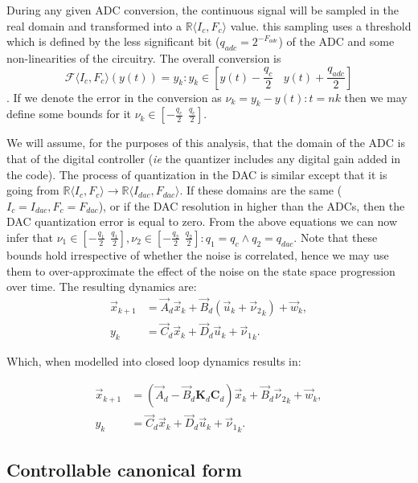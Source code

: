 \documentclass[runningheads,a4paper]{llncs}
\newcommand{\mat}[1]{\boldsymbol{#1}}
\begin{document}
During any given ADC conversion, the continuous signal will be sampled in the real domain and transformed into a $\mathbb{R}\langle I_{c},F_{c} \rangle$ value. this sampling uses a threshold which is defined by the less significant bit ($q_{adc}=2^{-F_{adc}}$) of the ADC and some non-linearities of the circuitry. The overall conversion is
$$\mathcal{F}\langle I_{c},F_{c} \rangle(y(t)) = y_k : y_k \in \left[y(t)-\frac{q_{c}}{2}\ \ \ \ y(t)+\frac{q_{adc}}{2}\right]$$.
If we denote the error in the conversion as $\nu_k=y_k-y(t) : t=nk$ then we may define some bounds for it $\nu_k \in [-\frac{q_{c}}{2}\ \ \frac{q_{c}}{2}]$.

We will assume, for the purposes of this analysis, that the domain of the ADC is that of the digital controller (\emph{ie} the quantizer includes any digital gain added in the code).
The process of quantization in the DAC is similar except that it is going from $\mathbb{R}\langle I_{c},F_{c} \rangle \rightarrow \mathbb{R}\langle I_{dac},F_{dac} \rangle$. If these domains are the same ($I_{c}=I_{dac},F_{c}=F_{dac}$), or if the DAC resolution in higher than the ADCs, then the DAC quantization error is equal to zero.
From the above equations we can now infer that $\nu_1 \in [-\frac{q_1}{2}\ \ \frac{q_1}{2}], \nu_2 \in [-\frac{q_2}{2}\ \ \frac{q_2}{2}] : q_1=q_{c} \wedge q_2=q_{dac}$.
Note that these bounds hold irrespective of whether the noise is correlated, hence we may use them to over-approximate the effect of the noise on the state space progression over time.
The resulting dynamics are:
\begin{align}
\label{eq:pre_quantization}
\vec{x}_{k+1} &= \vec{A}_d\vec{x}_k+\vec{B}_d(\vec{u}_k+{\vec{\nu}_2}_k) + \vec{w}_k,\\
y_k &= \vec{C}_d \vec{x}_ k + \vec{D}_d \vec{u}_ k+{\vec{\nu}_1}_k. 
\end{align}

Which, when modelled into closed loop dynamics results in:

\begin{align}
\label{eq:quantization}
\vec{x}_{k+1} &= (\vec{A}_d-\vec{B}_d\mat{K}_d\mat{C}_d) \vec{x}_k+\vec{B}_d{\vec{\nu}_2}_k + \vec{w}_k,\\
y_k &= \vec{C}_d \vec{x}_ k + \vec{D}_d \vec{u}_ k+{\vec{\nu}_1}_k. 
\end{align}

\subsection{Controllable canonical form} \label{sec:reachable}
\end{document}
